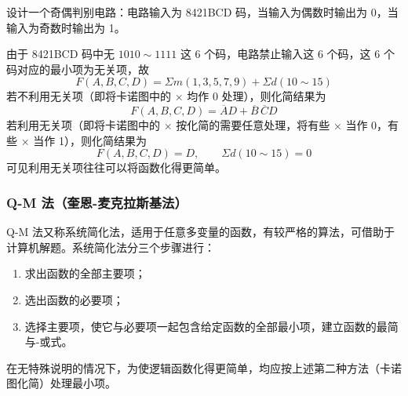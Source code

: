 \begin{longexample}
\label{ex:无关项}
设计一个奇偶判别电路：电路输入为 8421BCD 码，当输入为偶数时输出为 0，当输入为奇数时输出为 1。

\begin{solution}
	由于 8421BCD 码中无 $1010\sim1111$ 这 6 个码，电路禁止输入这 6 个码，这 6 个码对应的最小项为无关项，故
	\begin{equation}
		F(A,B,C,D)=\Sigma m(1,3,5,7,9)+\Sigma d(10\sim15)
		\label{eq:无关项:奇偶判别}
	\end{equation}
	若不利用无关项（即将卡诺图中的 × 均作 0 处理），则化简结果为
	\begin{equation}
		F(A,B,C,D)=\overline{A}D+\overline{B}\,\overline{C}D
		\label{eq:无关项:不利用}
	\end{equation}
	若利用无关项（即将卡诺图中的 × 按化简的需要任意处理，将有些 × 当作 0，有些 × 当作 1），则化简结果为
	\begin{equation}
		F(A,B,C,D)=D,\qquad \Sigma d(10\sim15)=0
		\label{eq:无关项:利用}
	\end{equation}
	可见利用无关项往往可以将函数化得更简单。
\end{solution}
\end{longexample}

\subsubsection{Q-M 法（奎恩-麦克拉斯基法）}

Q-M 法又称系统简化法，适用于任意多变量的函数，有较严格的算法，可借助于计算机解题。系统简化法分三个步骤进行：
\begin{enumerate}
	\item 求出函数的全部主要项；
	\item 选出函数的必要项；
	\item 选择主要项，使它与必要项一起包含给定函数的全部最小项，建立函数的最简与-或式。
\end{enumerate}

\begin{note}
	在无特殊说明的情况下，为使逻辑函数化得更简单，均应按上述第二种方法（卡诺图化简）处理最小项。
\end{note}
